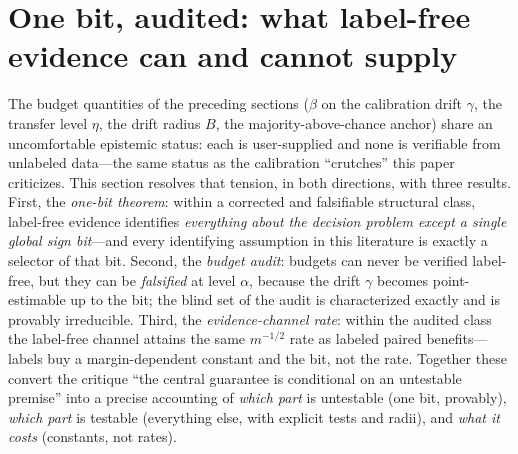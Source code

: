 \section{One bit, audited: what label-free evidence can and cannot supply}\label{sec:onebit}

The budget quantities of the preceding sections ($\beta$ on the calibration drift
$\gamma$, the transfer level $\eta$, the drift radius $B$, the majority-above-chance
anchor) share an uncomfortable epistemic status: each is user-supplied and none is
verifiable from unlabeled data---the same status as the calibration ``crutches'' this
paper criticizes. This section resolves that tension, in both directions, with three
results. First, the \emph{one-bit theorem}: within a corrected and falsifiable structural
class, label-free evidence identifies \emph{everything about the decision problem except
a single global sign bit}---and every identifying assumption in this literature is
exactly a selector of that bit. Second, the \emph{budget audit}: budgets can never be
verified label-free, but they can be \emph{falsified} at level $\alpha$, because the
drift $\gamma$ becomes point-estimable up to the bit; the blind set of the audit is
characterized exactly and is provably irreducible. Third, the \emph{evidence-channel
rate}: within the audited class the label-free channel attains the same $m^{-1/2}$ rate
as labeled paired benefits---labels buy a margin-dependent constant and the bit, not the
rate. Together these convert the critique ``the central guarantee is conditional on an
untestable premise'' into a precise accounting of \emph{which part} is untestable (one
bit, provably), \emph{which part} is testable (everything else, with explicit tests and
radii), and \emph{what it costs} (constants, not rates).


